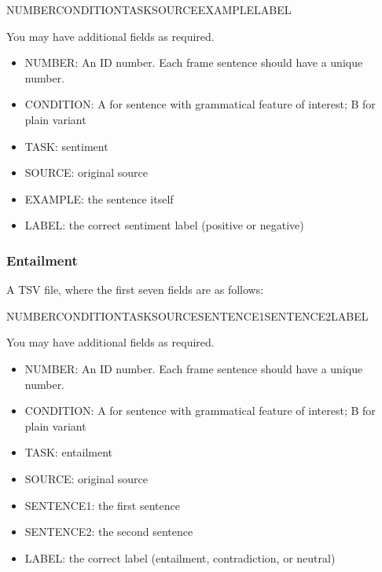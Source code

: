 \documentclass[12pt,table]{article}
\begin{document}
NUMBER\hspace{5ex}CONDITION\hspace{5ex}TASK\hspace{5ex}SOURCE\hspace{5ex}EXAMPLE\hspace{5ex}LABEL

You may have additional fields as required.

\begin{itemize}
\item NUMBER: An ID number. Each frame sentence should have a unique number.
\item CONDITION: A for sentence with grammatical feature of interest; B for plain variant
\item TASK: sentiment
\item SOURCE: original source
\item EXAMPLE: the sentence itself
\item LABEL: the correct sentiment label (positive or negative)
\end{itemize}

\subsubsection*{Entailment}

A TSV file, where the first seven fields are as follows:

NUMBER\hspace{5ex}CONDITION\hspace{5ex}TASK\hspace{5ex}SOURCE\hspace{5ex}SENTENCE1\hspace{5ex}SENTENCE2\hspace{5ex}LABEL

You may have additional fields as required.

\begin{itemize}
\item NUMBER: An ID number. Each frame sentence should have a unique number.
\item CONDITION: A for sentence with grammatical feature of interest; B for plain variant
\item TASK: entailment
\item SOURCE: original source
\item SENTENCE1: the first sentence 
\item SENTENCE2: the second sentence 
\item LABEL: the correct label (entailment, contradiction, or neutral)
\end{itemize}
\end{document}

